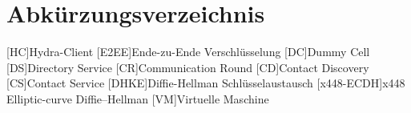 \section{Abkürzungsverzeichnis}

\begin{acronym}
[HC]{Hydra-Client}
[E2EE]{Ende-zu-Ende Verschlüsselung}
[DC]{Dummy Cell}
[DS]{Directory Service}
[CR]{Communication Round}
[CD]{Contact Discovery}
[CS]{Contact Service}
[DHKE]{Diffie-Hellman Schlüsselaustausch}
[x448-ECDH]{x448 Elliptic-curve Diffie–Hellman}
[VM]{Virtuelle Maschine}

\end{acronym}
